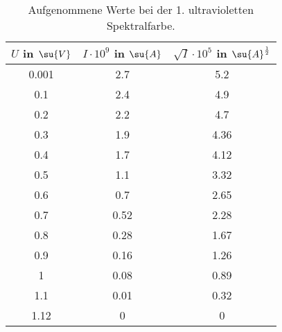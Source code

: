 \begin{table}
  \centering
  \label{tab:Gelb_Komplett}
  \caption{Aufgenommene Werte bei der 1. ultravioletten Spektralfarbe.}
  \begin{tabular}{c c c}
    \toprule
    $U$ in $\su{V}$ & $I\cdot 10^{9}$ in $\su{A}$ & $\sqrt{I}\cdot10^{5}$ in $\su{A}^{\frac{1}{2}}$ \\
    \midrule
    0.001 & 2.7  & 5.2  \\
    0.1   & 2.4  & 4.9  \\
    0.2   & 2.2  & 4.7  \\
    0.3   & 1.9  & 4.36 \\
    0.4   & 1.7  & 4.12 \\
    0.5   & 1.1  & 3.32 \\
    0.6   & 0.7  & 2.65 \\
    0.7   & 0.52 & 2.28 \\
    0.8   & 0.28 & 1.67 \\
    0.9   & 0.16 & 1.26 \\
    1     & 0.08 & 0.89 \\
    1.1   & 0.01 & 0.32 \\
    1.12  & 0    & 0    \\
    \bottomrule
  \end{tabular}
\end{table}
